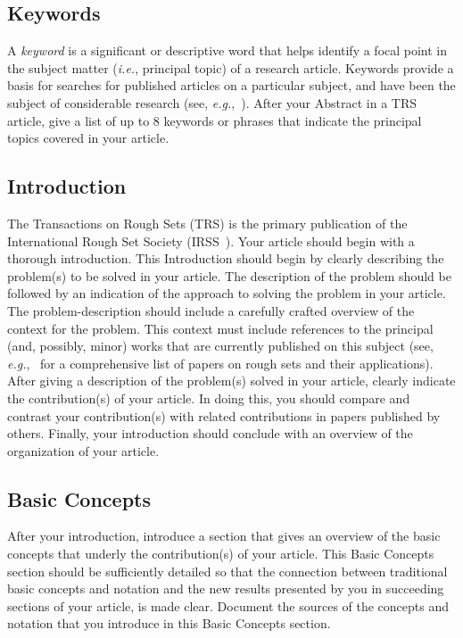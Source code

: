 \documentclass{llncs}
\begin{document}
\subsection{Keywords}
A {\it keyword} is a significant or descriptive word that helps identify a focal point in the subject matter ({\em i.e.}, principal topic) of a research article.  Keywords provide a basis for searches for published articles on a particular subject, and have been the subject of considerable research (see, {\em e.g.},~\cite{keywords}).
After your Abstract in a TRS article, give a list of up to 8 keywords or phrases that indicate the principal topics covered in your article.

\subsection{Introduction}
The Transactions on Rough Sets (TRS) is the primary publication of the International Rough Set Society (IRSS~\cite{IRSS}).   Your article should begin with a thorough introduction.  This Introduction should begin by clearly describing the problem(s) to be solved in your article.  The description of the problem should be followed by an indication of the approach to solving the problem in your article.  The problem-description should include a carefully crafted overview of the context for the problem.  This context must include references to the principal (and, possibly, minor) works that are currently published on this subject (see, {\em e.g.},~\cite{RSDS} for a comprehensive list of papers on rough sets and their applications).  After giving a description of the problem(s) solved in your article, clearly indicate the contribution(s) of your article.  In doing this, you should compare and contrast your contribution(s) with related contributions in papers published by others.  Finally, your introduction should conclude with an overview of the organization of your article.

\subsection{Basic Concepts}  After your introduction, introduce a section that gives an overview of the basic concepts that underly the contribution(s) of your article.  This Basic Concepts section should be sufficiently detailed so that the connection between traditional basic concepts and notation and the new results presented by you in succeeding sections of your article, is made clear.  Document the sources of the concepts and notation that you introduce in this Basic Concepts section.
\end{document}
